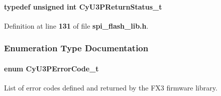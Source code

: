 \paragraph[{Cy\+U3\+P\+Return\+Status\+\_\+t}]{\setlength{\rightskip}{0pt plus 5cm}typedef unsigned int {\bf Cy\+U3\+P\+Return\+Status\+\_\+t}}\label{spi__flash__lib_8h_a600f02dcd067954f74378e2a20ef0554}


Definition at line {\bf 131} of file {\bf spi\+\_\+flash\+\_\+lib.\+h}.



\subsubsection{Enumeration Type Documentation}
\paragraph[{Cy\+U3\+P\+Error\+Code\+\_\+t}]{\setlength{\rightskip}{0pt plus 5cm}enum {\bf Cy\+U3\+P\+Error\+Code\+\_\+t}}\label{spi__flash__lib_8h_af668bfc4c39252082d2e9d4c221a9e12}


List of error codes defined and returned by the F\+X3 firmware library. 


